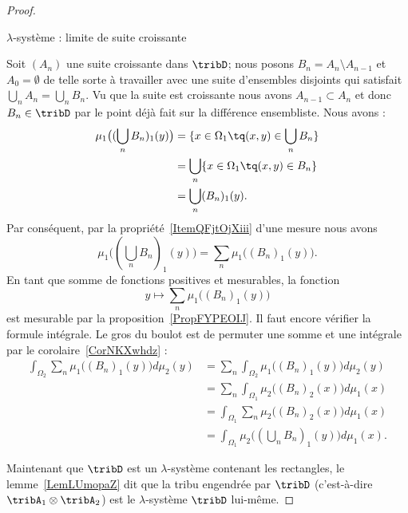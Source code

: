 \begin{proof}
\begin{subproof}
        \item[\( \lambda\)-système : limite de suite croissante]

            Soit \( (A_n)\) une suite croissante dans \( \tribD\); nous posons \( B_n=A_n\setminus A_{n-1}\) et \( A_0=\emptyset\) de telle sorte à travailler avec une suite d'ensembles disjoints qui satisfait \( \bigcup_nA_n=\bigcup_nB_n\). Vu que la suite est croissante nous avons \( A_{n-1}\subset A_n\) et donc \( B_n\in\tribD\) par le point déjà fait sur la différence ensembliste. Nous avons :
            \begin{subequations}
                \begin{align}
                    \mu_1\big( (\bigcup_nB_n)_1(y) \big)&=\{ x\in \Omega_1\tq (x,y)\in\bigcup_nB_n \}\\
                    &=\bigcup_n\{ x\in\Omega_1\tq (x,y)\in B_n \}\\
                    &=\bigcup_n (B_n)_1(y).
                \end{align}
            \end{subequations}
            Par conséquent, par la propriété~\ref{ItemQFjtOjXiii} d'une mesure nous avons
            \begin{equation}
                \mu_1\big( (\bigcup_nB_n)_1(y) \big)=\sum_n\mu_1\big( (B_n)_1(y) \big).
            \end{equation}
            En tant que somme de fonctions positives et mesurables, la fonction
            \begin{equation}
                y\mapsto\sum_n\mu_1\big( (B_n)_1(y) \big)
            \end{equation}
            est mesurable par la proposition~\ref{PropFYPEOIJ}. Il faut encore vérifier la formule intégrale. Le gros du boulot est de permuter une somme et une intégrale par le corolaire~\ref{CorNKXwhdz} :
            \begin{subequations}
                \begin{align}
                    \int_{\Omega_2}\sum_n\mu_1\big( (B_n)_1(y) \big)d\mu_2(y)&=\sum_n\int_{\Omega_2}\mu_1\big( (B_n)_1(y) \big)d\mu_2(y)\\
                    &=\sum_n\int_{\Omega_1}\mu_2\big( (B_n)_2(x) \big)d\mu_1(x)\\
                    &=\int_{\Omega_1}\sum_n\mu_2\big( (B_n)_2(x) \big)d\mu_1(x)\\
                    &=\int_{\Omega_1}\mu_2\big( (\bigcup_nB_n)_1(y) \big)d\mu_1(x).
                \end{align}
            \end{subequations}
    \end{subproof}
    Maintenant que \( \tribD\) est un $\lambda$-système contenant les rectangles, le lemme~\ref{LemLUmopaZ} dit que la tribu engendrée par \( \tribD\) (c'est-à-dire \( \tribA_1\otimes \tribA_2\)) est le $\lambda$-système \( \tribD\) lui-même.


\end{proof}
